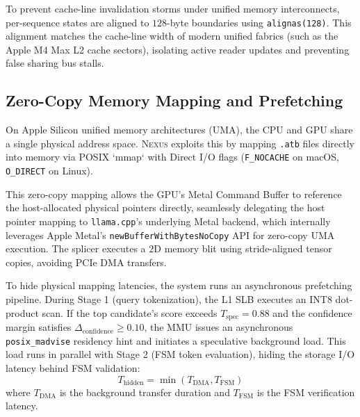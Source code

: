 To prevent cache-line invalidation storms under unified memory interconnects, per-sequence states are aligned to $128$-byte boundaries using \texttt{alignas(128)}. This alignment matches the cache-line width of modern unified fabrics (such as the Apple M4 Max L2 cache sectors), isolating active reader updates and preventing false sharing bus stalls.

\subsection{Zero-Copy Memory Mapping and Prefetching}
On Apple Silicon unified memory architectures (UMA), the CPU and GPU share a single physical address space. \textsc{Nexus} exploits this by mapping \texttt{.atb} files directly into memory via POSIX `mmap` with Direct I/O flags (\texttt{F\_NOCACHE} on macOS, \texttt{O\_DIRECT} on Linux). 

This zero-copy mapping allows the GPU's Metal Command Buffer to reference the host-allocated physical pointers directly, seamlessly delegating the host pointer mapping to \texttt{llama.cpp}'s underlying Metal backend, which internally leverages Apple Metal's \texttt{newBufferWithBytesNoCopy} API for zero-copy UMA execution. The splicer executes a $2\text{D}$ memory blit using stride-aligned tensor copies, avoiding PCIe DMA transfers.

To hide physical mapping latencies, the system runs an asynchronous prefetching pipeline. During Stage 1 (query tokenization), the L1 SLB executes an INT8 dot-product scan. If the top candidate's score exceeds $T_{\text{spec}} = 0.88$ and the confidence margin satisfies $\Delta_{\text{confidence}} \ge 0.10$, the MMU issues an asynchronous \texttt{posix\_madvise} residency hint and initiates a speculative background load. This load runs in parallel with Stage 2 (FSM token evaluation), hiding the storage I/O latency behind FSM validation:
\begin{equation}
T_{\text{hidden}} = \min\left( T_{\text{DMA}}, T_{\text{FSM}} \right)
\end{equation}
where $T_{\text{DMA}}$ is the background transfer duration and $T_{\text{FSM}}$ is the FSM verification latency.
